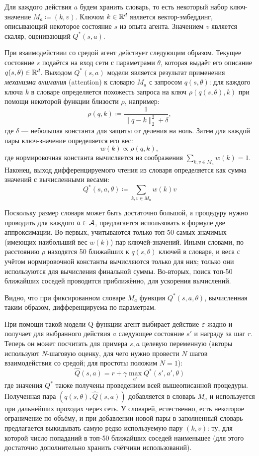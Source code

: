 Для каждого действия $a$ будем хранить словарь, то есть некоторый набор ключ-значение $M_a \coloneqq (k, v)$. Ключом $k \in \mathbb{R}^d$ является вектор-эмбеддинг, описывающий некоторое состояние $s$ из опыта агента. Значением $v$ является скаляр, оценивающий $Q^*(s, a)$.

При взаимодействии со средой агент действует следующим образом. Текущее состояние $s$ подаётся на вход сети с параметрами $\theta$, которая выдаёт его описание $q(s, \theta) \in \mathbb{R}^d$. Выходом $Q^*(s, a)$ модели является результат применения \emph{механизма внимания} (attention) к словарю $M_a$ с запросом $q(s, \theta)$: для каждого ключа $k$ в словаре определяется похожесть запроса на ключ $\rho(q(s, \theta), k)$ при помощи некоторой функции близости $\rho$, например:
$$\rho(q, k) \coloneqq \frac{1}{\|q - k\|_2^2 + \delta},$$
где $\delta$ --- небольшая константа для защиты от деления на ноль. Затем для каждой пары ключ-значение определяется его вес:
$$w(k) \propto \rho(q, k),$$
где нормировочная константа вычисляется из соображения $\sum_{k, v \in M_a} w(k) = 1$. Наконец, выход дифференцируемого чтения из словаря определяется как сумма значений с вычисленными весами:
$$Q^*(s, a, \theta) \coloneqq \sum_{k, v \in M_a} w(k)v$$

Поскольку размер словаря может быть достаточно большой, а процедуру нужно проводить для каждого $a \in \mathcal{A}$, предлагается использовать в формуле две аппроксимации. Во-первых, учитываются только топ-50 самых значимых (имеющих наибольший вес $w(k)$) пар ключей-значений. Иными словами, по расстоянию $\rho$ находятся 50 ближайших к $q(s, \theta)$ ключей в словаре, и веса с учётом нормировочной константы вычисляются только для них; только они используются для вычисления финальной суммы. Во-вторых, поиск топ-50 ближайших соседей проводится приближённо, для ускорения вычислений.

Видно, что при фиксированном словаре $M_a$ функция $Q^*(s, a, \theta)$, вычисленная таким образом, дифференцируема по параметрам.

При помощи такой модели Q-функции агент выбирает действие $\varepsilon$-жадно и получает для выбранного действия $a$ следующее состояние $s'$ и награду за шаг $r$. Теперь он может посчитать для примера $s, a$ целевую переменную (авторы используют $N$-шаговую оценку, для чего нужно провести $N$ шагов взаимодействия со средой; для простоты положим $N=1$):
$$\hat{Q}(s, a) = r + \gamma \max_{a'} Q^*(s', a', \theta)$$
где значения $Q^*$ также получены проведением всей вышеописанной процедуры. Полученная пара $(q(s, \theta), \hat{Q}(s, a))$ добавляется в словарь $M_a$ и используется при дальнейших проходах через сеть. У словарей, естественно, есть некоторое ограничение по объёму, и при добавлении новой пары в заполненный словарь предлагается выкидывать самую редко используемую пару $(k, v)$: ту, для которой число попаданий в топ-50 ближайших соседей наименьшее (для этого достаточно дополнительно хранить счётчики использований).

